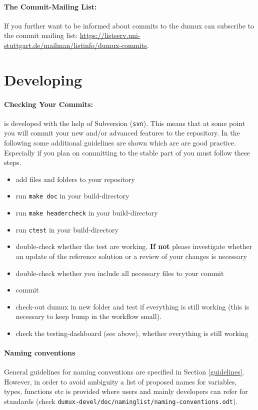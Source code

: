\paragraph{The Commit-Mailing List:}
If you further want to be informed about commits to the dumux can subscribe
to the commit mailing list:
\url{https://listserv.uni-stuttgart.de/mailman/listinfo/dumux-commits}.

\section{Developing \Dumux}
\paragraph{Checking Your Commits:}
\Dumux is developed with the help of Subversion (\texttt{svn}).
This means that at some point you will commit your new and/or advanced features
to the repository. In the following some additional guidelines are shown which are 
are good practice. Especially if you plan on committing to the stable part of
\Dumux you must follow these steps.
\begin{itemize}
  \item add files and folders to your repository
  \item run \texttt{make doc} in your build-directory
  \item run \texttt{make headercheck} in your build-directory
  \item run \texttt{ctest} in your build-directory
  \item double-check whether the test are working. \textbf{If not} please
        investigate whether an update of the reference solution or a review
        of your changes is necessary
  \item double-check whether you include all necessary files to your commit
  \item commit
  \item check-out dumux in new folder and test if everything is still working
        (this is necessary to keep bump in the workflow small).
  \item check the testing-dashboard (see above), whether everything is still working
\end{itemize}

\paragraph{Naming conventions} 
General guidelines for naming conventions are specified in Section \ref{guidelines}.
However, in order to avoid ambiguity a list of proposed names for variables, types,
functions etc is provided where users and mainly \Dumux developers can refer for
standards (check \texttt{dumux-devel/\allowbreak doc/\allowbreak naminglist/\allowbreak naming-conventions.odt}).

